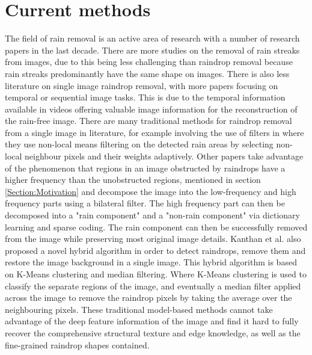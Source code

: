 \documentclass[11pt]{ociamthesis}  %
\begin{document}
\section{Current methods}
\label{Section: Current Methods}
The field of rain removal is an active area of research with a number of research papers in the last decade. There are more studies on the removal of rain streaks from images, due to this being less challenging than raindrop removal because rain streaks predominantly have the same shape on images. There is also less literature on single image raindrop removal, with more papers focusing on temporal or sequential image tasks. This is due to the temporal information available in videos offering valuable image information for the reconstruction of the rain-free image. There are many traditional methods for raindrop removal from a single image in literature, for example involving the use of filters in \cite{6738189} where they use non-local means filtering on the detected rain areas by selecting non-local neighbour pixels and their weights adaptively. Other papers take advantage of the phenomenon that regions in an image obstructed by raindrops have a higher frequency than the unobstructed regions, mentioned in section \ref{Section:Motivation} and decompose the image into the low-frequency and high frequency parts using a bilateral filter. The high frequency part can then be decomposed into a "rain component" and a "non-rain component" via dictionary learning and sparse coding. The rain component can then be successfully removed from the image while preserving most original image details\cite{5946766}. Kanthan et al.\cite{7435707} also proposed a novel hybrid algorithm in order to detect raindrops, remove them and restore the image background in a single image. This hybrid algorithm is based on K-Means clustering and median filtering. Where K-Means clustering is used to classify the separate regions of the image, and eventually a median filter applied across the image to remove the raindrop pixels by taking the average over the neighbouring pixels. These traditional model-based methods cannot take advantage of the deep feature information of the image and find it hard to fully recover the comprehensive structural texture and edge knowledge, as well as the fine-grained raindrop shapes contained\cite{SHAO2021265}.
\end{document}

